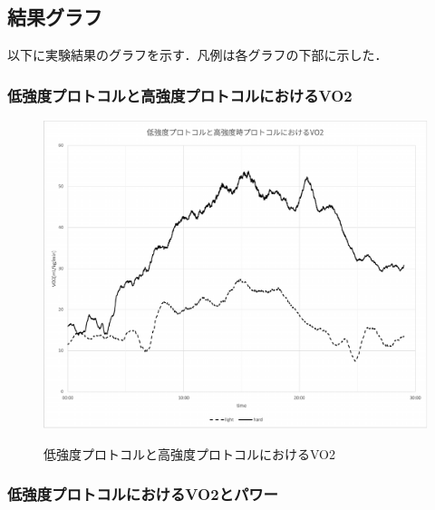 \subsection{結果グラフ}

以下に実験結果のグラフを示す．凡例は各グラフの下部に示した．

\subsubsection{低強度プロトコルと高強度プロトコルにおけるVO2}

\begin{figure}[H]
  \begin{center}
    \label{fig:light_hard_vo2}
    \includegraphics[width=12cm]{fig/light_hard_vo2}
    \caption{低強度プロトコルと高強度プロトコルにおけるVO2}
  \end{center}
\end{figure}

\subsubsection{低強度プロトコルにおけるVO2とパワー}

